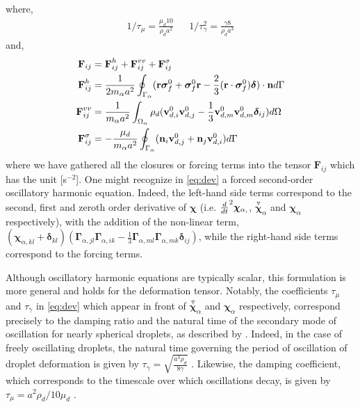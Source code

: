 where,
\begin{align}
    1/\tau_\mu 
    =
    \frac{\mu_d 10}{\rho_d a^2}  
    &&
    1/\tau_\gamma^2
    = 
    \frac{\gamma 8 }{\rho_d a^3} 
\end{align}
and,
\begin{align}
    \textbf{F}_{ij}
    &= 
    \textbf{F}_{ij}^h
    +\textbf{F}_{ij}^{vv}
    + \textbf{F}_{ij}^{\sigma}\\
    \textbf{F}_{ij}^h
    &= \frac{1}{2m_\alpha a^2}\oint_{\Gamma_{\alpha}} (\textbf{r}\bm\sigma_f^0 + \bm\sigma_f^0\textbf{r} - \frac{2}{3}(\textbf{r}\cdot \bm\sigma_f^0) \bm\delta)\cdot \textbf{n} d\Gamma \\
    \textbf{F}_{ij}^{vv}
    &= 
    \frac{1}{m_\alpha a^2}\int_{\Omega_{\alpha}} \rho_d(\textbf{v}_{d,i}^0\textbf{v}_{d,j}^0 - \frac{1}{3}\textbf{v}_{d,m}^0\textbf{v}_{d,m}^0 \bm\delta_{ij})  d\Omega\\
    \textbf{F}_{ij}^{\sigma}
    &= - \frac{\mu_d}{m_\alpha a^2} \oint_{\Gamma_{\alpha}} (\textbf{n}_i \textbf{v}_{d,j}^0 + \textbf{n}_j \textbf{v}_{d,i}^0) d\Gamma\nonumber
\end{align}
where we have gathered all the closures or forcing terms into the tensor $\textbf{F}_{ij}$ which has the unit [s$^{-2}$]. 
One might recognize in \ref{eq:dev} a forced second-order oscillatory harmonic equation.
Indeed, the left-hand side terms correspond to the second, first and zeroth order derivative of $\bm\chi$ (i.e. $\frac{d}{dt}^2 \bm\chi_{\alpha,}$, $\overset{ \triangledown  }{\bm\chi}_\alpha$ and $\bm\chi_\alpha$ respectively), with the addition of the non-linear term, $ (\bm\chi_{\alpha,kl}+\bm\delta_{kl}) 
(\bm\Gamma_{\alpha,jl}\bm\Gamma_{\alpha,ik}  
- \frac{1}{3}
\bm\Gamma_{\alpha,ml}\bm\Gamma_{\alpha,mk}  
\bm\delta_{ij}
)$, while the right-hand side terms correspond to the forcing terms. 

Although oscillatory harmonic equations are typically scalar, this formulation is more general and holds for the deformation tensor. 
Notably, the coefficients $\tau_\mu$ and $\tau_\gamma$ in \ref{eq:dev} which appear in front of $\overset{ \triangledown  }{\bm\chi}_\alpha$ and $\bm\chi_\alpha$ respectively, correspond precisely to the damping ratio and the natural time of the secondary mode of oscillation for nearly spherical droplets, as described by \citep{lamb1924hydrodynamics}. 
Indeed, in the case of freely oscillating droplets, the natural time governing the period of oscillation of droplet deformation is given by $\tau_\gamma = \sqrt{\frac{a^3\rho_d}{8 \gamma }}$ \citep{lamb1924hydrodynamics}. 
Likewise, the damping coefficient, which corresponds to the timescale over which oscillations decay, is given by  $\tau_\mu = a^2\rho_d/10 \mu_d$ \citep{lamb1924hydrodynamics}. 


